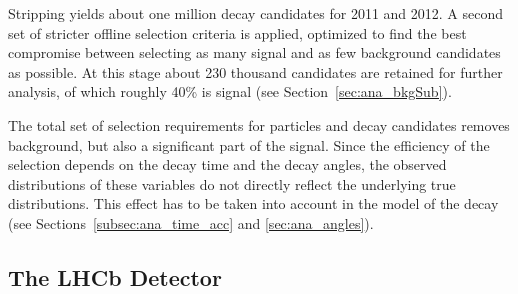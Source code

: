 Stripping yields about one million \BstoJpsiKK{} decay candidates for 2011 and 2012. A second set of stricter offline selection criteria is
applied, optimized to find the best compromise between selecting as many signal and as few background candidates as possible. At this stage
about 230 thousand candidates are retained for further analysis, of which roughly 40\% is signal (see Section~\ref{sec:ana_bkgSub}).

The total set of selection requirements for particles and decay candidates removes background, but also a significant part of the signal.
Since the efficiency of the selection depends on the decay time and the decay angles, the observed distributions of these variables do not
directly reflect the underlying true distributions. This effect has to be taken into account in the model of the decay (see
Sections~\ref{subsec:ana_time_acc} and \ref{sec:ana_angles}).


\subsection{The LHCb Detector}
\label{subsec:intro_LHCb_detector}

